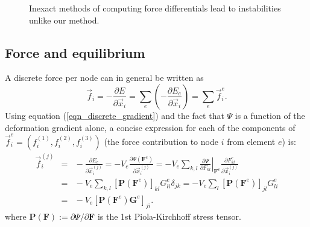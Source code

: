 \begin{figure}[th]
\caption[A comparison of our method to the warped stiffness method.]{Inexact methods of computing force differentials lead to instabilities
unlike our method. }
\label{fig:warpedstiff}
\end{figure}

\subsection{Force and equilibrium}
\label{sec:force}

A discrete force per node can in general be written as
\begin{equation}
\vec{f}_i=-\frac{\partial E}{\partial\vec{x}_i}=\sum_e\left(-\frac{\partial E_e}{\partial\vec{x}_i}\right)=\sum_e\vec{f}_i^e.
\label{eqn_elemental_forces}
\end{equation}
 Using equation (\ref{eqn_discrete_gradient}) and the fact that $\Psi$ is a function of the deformation gradient alone, a concise expression for each of the components
of $\vec{f}_i^e=(f_i^{(1)},f_i^{(2)},f_i^{(3)})$ (the force contribution to node $i$ from element $e$) is: 
\begin{eqnarray}
\vec{f}_i^{(j)}\!\!\!&\!\!\!=\!\!\!&\!\!\!-\frac{\partial E_e}{\partial\vec{x}_i^{(j)}}=-V_e\frac{\partial\Psi(\mathbf{F}^e)}{\partial\vec{x}_i^{(j)}}
=
-V_e\sum_{k,l}\left.\frac{\partial\Psi}{\partial F_{kl}}\right|_{\mathbf{F}^e}\frac{\partial F_{kl}^e}{\partial\vec{x}_i^{(j)}} \nonumber \\
\!\!\!&\!\!\!=\!\!\!&\!\!\!
-V_e\sum_{k,l}[\mathbf{P}(\mathbf{F}^e)]_{kl}G_{li}^e\delta_{jk}
=
-V_e\sum_l[\mathbf{P}(\mathbf{F}^e)]_{jl}G_{li}^e \nonumber \\
\!\!\!&\!\!\!=\!\!\!&\!\!\!
-V_e[\mathbf{P}(\mathbf{F}^e)\mathbf{G}^e]_{ji}.
\label{eqn_nodal_forces}
\end{eqnarray}
where $\mathbf{P}(\mathbf{F})\!:=\!\partial\Psi/\partial\mathbf{F}$ is
the 1st Piola-Kirchhoff stress tensor.


